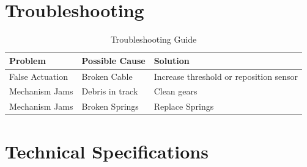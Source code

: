 \documentclass[12pt, a4paper]{report}
\begin{document}

\chapter{Troubleshooting}
    \begin{table}[H]
        \centering
        \begin{tabular}{|p{4cm}|p{5cm}|p{5cm}|}
        \hline
        \textbf{Problem} & \textbf{Possible Cause} & \textbf{Solution} \\ \hline
        False Actuation & Broken Cable & Increase threshold or reposition sensor \\ \hline
        Mechanism Jams & Debris in track & Clean gears \\ \hline
        Mechanism Jams & Broken Springs & Replace Springs \\ \hline
        \end{tabular}
        \caption{Troubleshooting Guide}
    \end{table}

\appendix
\chapter{Technical Specifications}
\end{document}
